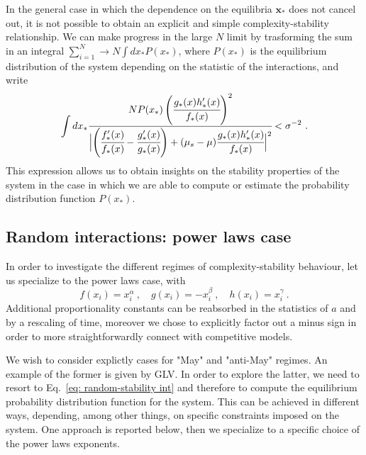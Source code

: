 \documentclass[%
 reprint,
 amsmath,amssymb,
 aps,
]{revtex4-2}
\begin{document}
In the general case in which the dependence on the equilibria
$\mathbf{x}_*$ does not cancel out, it is not possible to
obtain an explicit and simple complexity-stability relationship.
We can make progress in the large $N$ limit by
trasforming the sum in an integral 
$\sum_{i=1}^N\to N\int dx_*P(x_*)$, where $P(x_*)$ 
is the equilibrium distribution of the system
depending on the statistic of the interactions,
and write
\begin{equation}\label{eq: random-stability int}
    \int dx_* \cfrac{NP(x_*) \left(\cfrac{g_*(x)h_*'(x)}{f_*(x)}\right)^2}{
        \Bigl |\left(\cfrac{f_*'(x)}{f_*(x)} -
        \cfrac{g_*'(x)}{g_*(x)}\right)
        +(\mu_s-\mu) \cfrac{g_*(x)h_*'(x)}{f_*(x)} \Bigl |^2}
    < \sigma^{-2} \ .
\end{equation}
This expression allows us to obtain insights on the stability properties of
the system in the case in which we are able to compute or estimate 
the probability distribution function $P(x_*)$.

\subsection{Random interactions: power laws case}
In order to investigate the different regimes
of complexity-stability behaviour,
let us specialize to the power laws case, with 
\begin{equation}
    f(x_i)=x_i^{\alpha} \ , \quad g(x_i)=-x_i^{\beta} \ , \quad h(x_i)=x_i^{\gamma} \ .
\end{equation} 
Additional proportionality constants can be reabsorbed in the statistics
of $a$ and by a rescaling of time, moreover we chose to explicitly
factor out a minus sign in order to more straightforwardly connect
with competitive models.

We wish to consider explictly cases
for "May" and "anti-May" regimes.
An example of the former is given by GLV.
In order to explore the latter, we 
need to resort to Eq.~\eqref{eq: random-stability int} and therefore
to compute the equilibrium probability distribution function
for the system. This can be achieved in different ways,
depending, among other things, on specific constraints 
imposed on the system. 
One approach is reported below, 
then we specialize to a specific choice of 
the power laws exponents.
\end{document}
